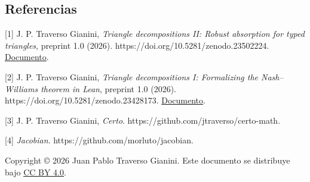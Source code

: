 \documentclass[spanish,11pt,a4paper]{article}
\begin{document}
\noindent\begin{minipage}{\linewidth}
\subsection{Referencias}\label{referencias}

\begingroup\small\raggedright
\setlength{\parskip}{3pt}

{[}1{]} J. P. Traverso Gianini, \emph{Triangle decompositions II: Robust absorption for typed triangles}, preprint 1.0 (2026). https://doi.org/10.5281/zenodo.23502224. \href{https://github.com/jtraverso/nash-williams-triangle-decompositions-release/blob/main/preprints/PAPER_II/01_manuscript/PAPER_II_preprint_v1.0_es.md}{Documento}.

{[}2{]} J. P. Traverso Gianini, \emph{Triangle decompositions I: Formalizing the Nash--Williams theorem in Lean}, preprint 1.0 (2026). https://doi.org/10.5281/zenodo.23428173. \href{https://github.com/jtraverso/nash-williams-triangle-decompositions-release/blob/main/preprints/PAPER_I/01_manuscript/PAPER_I_preprint_v1.0_es.md}{Documento}.

{[}3{]} J. P. Traverso Gianini, \emph{Certo}. https://github.com/jtraverso/certo-math.

{[}4{]} \emph{Jacobian}. https://github.com/morluto/jacobian.

Copyright © 2026 Juan Pablo Traverso Gianini. Este documento se distribuye bajo \href{https://creativecommons.org/licenses/by/4.0/}{CC BY 4.0}.

\endgroup

\end{minipage}
\end{document}
